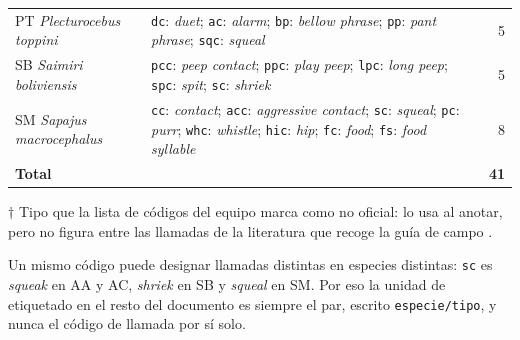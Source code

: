 \begin{table}[htbp]
\begin{threeparttable}
\begin{tabular}{@{}L{2.6cm}L{10.4cm}r@{}}
            \addlinespace
            PT \textit{Plecturocebus toppini}              &
            \texttt{dc}: \textit{duet};
            \texttt{ac}: \textit{alarm};
            \texttt{bp}: \textit{bellow phrase}\tnote{$\dagger$};
            \texttt{pp}: \textit{pant phrase}\tnote{$\dagger$};
            \texttt{sqc}: \textit{squeal}\tnote{$\dagger$} & 5                                                                           \\
            \addlinespace
            SB \textit{Saimiri boliviensis}                &
            \texttt{pcc}: \textit{peep contact};
            \texttt{ppc}: \textit{play peep};
            \texttt{lpc}: \textit{long peep};
            \texttt{spc}: \textit{spit};
            \texttt{sc}: \textit{shriek}                   & 5                                                                           \\
            \addlinespace
            SM \textit{Sapajus macrocephalus}              &
            \texttt{cc}: \textit{contact};
            \texttt{acc}: \textit{aggressive contact};
            \texttt{sc}: \textit{squeal};
            \texttt{pc}: \textit{purr};
            \texttt{whc}: \textit{whistle};
            \texttt{hic}: \textit{hip};
            \texttt{fc}: \textit{food};
            \texttt{fs}: \textit{food syllable}            & 8                                                                           \\
            \midrule
            \textbf{Total}                                 &                                            & \textbf{41}                    \\
            \bottomrule
        \end{tabular}
        \begin{tablenotes}[flushleft]
            \footnotesize
            \item[$\dagger$] Tipo que la lista de códigos del equipo marca como no
            oficial: lo usa al anotar, pero no figura entre las llamadas de la
            literatura que recoge la guía de campo \citep{proyecto8_guia_2025}.
        \end{tablenotes}
    \end{threeparttable}
\end{table}

Un mismo código puede designar llamadas distintas en especies distintas:
\texttt{sc} es \textit{squeak} en AA y AC, \textit{shriek} en SB y
\textit{squeal} en SM. Por eso la unidad de etiquetado en el resto del documento
es siempre el par, escrito \texttt{especie/tipo}, y nunca el código de llamada
por sí solo.

